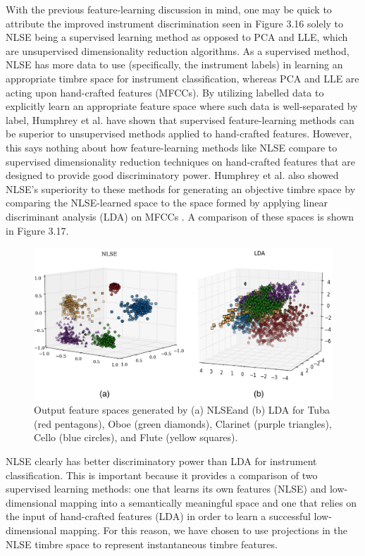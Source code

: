 \documentclass[12pt]{report} 	%
\numberwithin{figure}{chapter}
\numberwithin{table}{chapter}
\numberwithin{equation}{chapter}
\begin{document}
\begin{flushleft}
With the previous feature-learning discussion in mind, one may be quick to attribute the improved instrument discrimination seen in Figure 3.16 solely to NLSE being a supervised learning method as opposed to PCA and LLE, which are unsupervised dimensionality reduction algorithms. As a supervised method, NLSE has more data to use (specifically, the instrument labels) in learning an appropriate timbre space for instrument classification, whereas PCA and LLE are acting upon hand-crafted features (MFCCs). By utilizing labelled data to explicitly learn an appropriate feature space where such data is well-separated by label, Humphrey et al. have shown that supervised feature-learning methods can be superior to unsupervised methods applied to hand-crafted features. However, this says nothing about how feature-learning methods like NLSE compare to supervised dimensionality reduction techniques on hand-crafted features that are designed to provide good discriminatory power. Humphrey et al. also showed NLSE's superiority to these methods for generating an objective timbre space by comparing the NLSE-learned space to the space formed by applying linear discriminant analysis (LDA) on MFCCs \cite{humphrey2013feature}. A comparison of these spaces is shown in Figure 3.17.
\begin{figure}[h!]
\begin{center}
\includegraphics[width=\linewidth]{NLSECluster2}
\caption[NLSE vs. LDA instrument clusters]{Output feature spaces generated by (a) NLSEand (b) LDA for Tuba (red pentagons), Oboe (green diamonds), Clarinet (purple triangles), Cello (blue circles), and Flute (yellow squares).}
\end{center}
\end{figure}

NLSE clearly has better discriminatory power than LDA for instrument classification. This is important because it provides a comparison of two supervised learning methods: one that learns its own features (NLSE) and low-dimensional mapping into a semantically meaningful space and one that relies on the input of hand-crafted features (LDA) in order to learn a successful low-dimensional mapping. For this reason, we have chosen to use projections in the NLSE timbre space to represent instantaneous timbre features.


\end{flushleft}
\end{document}
